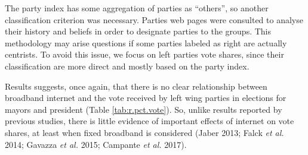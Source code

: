 \documentclass[
  12pt,
]{article}
\begin{document}
The party index has some aggregation of parties as ``others'', so
another classification criterion was necessary. Parties web pages were
consulted to analyse their history and beliefs in order to designate
parties to the groups. This methodology may arise questions if some
parties labeled as right are actually centrists. To avoid this issue, we
focus on left parties vote shares, since their classification are more
direct and mostly based on the party index.

Results suggests, once again, that there is no clear relationship
between broadband internet and the vote received by left wing parties in
elections for mayors and president (Table \ref{tab:r.pct.vote}). So,
unlike results reported by previous studies, there is little evidence of
important effects of internet on vote shares, at least when fixed
broadband is considered (Jaber 2013; Falck \emph{et al.} 2014; Gavazza
\emph{et al.} 2015; Campante \emph{et al.} 2017).
\end{document}
